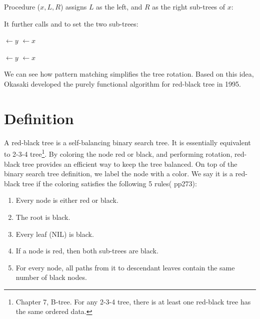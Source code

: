 \documentclass[b5paper]{article}
\begin{document}
Procedure ($x, L, R$) assigns $L$ as the left, and $R$ as the right sub-trees of $x$:

\begin{algorithmic}[1]
  \State {}
  \State {}
\EndFunction
\end{algorithmic}

It further calls  and  to set the two sub-trees:

\begin{algorithmic}[1]
  \State {} $\gets y$
     $\gets x$
  \EndIf
  \EndFunction

\Statex

  \State {} $\gets y$
     $\gets x$
  \EndIf
\EndFunction
\end{algorithmic}

We can see how pattern matching simplifies the tree rotation. Based on this idea, Okasaki developed the purely functional algorithm for red-black tree in 1995\cite{okasaki}.

\begin{Exercise}
\end{Exercise}

\section{Definition}

A red-black tree is a self-balancing binary search tree\cite{wiki-rbt}. It is essentially equivalent to 2-3-4 tree\footnote{Chapter 7, B-tree. For any 2-3-4 tree, there is at least one red-black tree has the same ordered data.}. By coloring the node red or black, and performing rotation, red-black tree provides an efficient way to keep the tree balanced. On top of the binary search tree definition, we label the node with a color. We say it is a red-black tree if the coloring satisfies the following 5 rules(\cite{CLRS} pp273):

\begin{enumerate}
\item Every node is either red or black.
\item The root is black.
\item Every leaf (NIL) is black.
\item If a node is red, then both sub-trees are black.
\item For every node, all paths from it to descendant leaves contain the same number of black nodes.
\end{enumerate}
\end{document}
